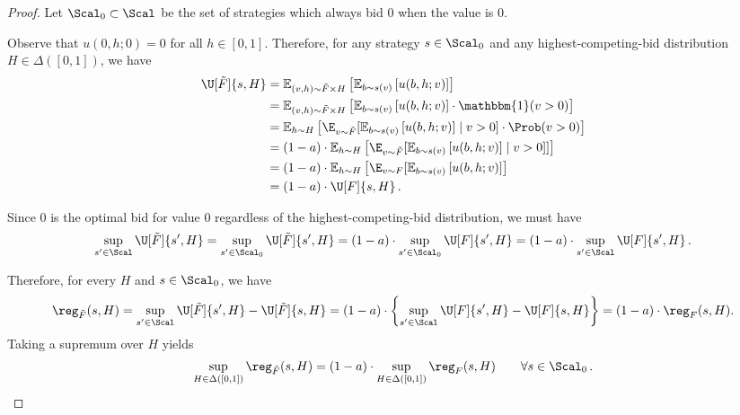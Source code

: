 \begin{proof}
	
	Let $\Scal_0 \subset \Scal$ be the set of strategies which always bid $0$ when the value is $0$.
	
	Observe that $u(0,h;0) = 0$ for all $h \in [0,1]$. Therefore, for any strategy $s \in \Scal_0$ and any highest-competing-bid distribution $H \in \Delta([0,1])$, we have
	\begin{align*}
		\U[\tilde F]{s, H} &= \mathbb{E}_{(v, h) \sim \tilde F \times H}  \left[ \mathbb{E}_{b \sim s(v)} \left[ u(b,h;v) \right] \right]\\
		&= \mathbb{E}_{(v, h) \sim \tilde F \times H}  \left[ \mathbb{E}_{b \sim s(v)} \left[ u(b,h;v) \right] \cdot \mathbbm{1}(v > 0) \right]\\
		&= \mathbb{E}_{h \sim H}\left[ \E_{v \sim \tilde F}  [ \mathbb{E}_{b \sim s(v)} \left[ u(b,h;v) \right] \mid v > 0] \cdot \Prob(v > 0) \right]\\
		&= (1 - a) \cdot \mathbb{E}_{h \sim H}\left[ \E_{v \sim \tilde F}  [ \mathbb{E}_{b \sim s(v)} \left[ u(b,h;v) \right] \mid v > 0]] \right]\\
		&= (1 - a) \cdot \mathbb{E}_{h \sim H}\left[ \E_{v \sim F} [ \mathbb{E}_{b \sim s(v)} \left[ u(b,h;v) \right] \right]\\
		&= (1 - a) \cdot \U[F]{s, H}\,.
	\end{align*}
	
	Since 0 is the optimal bid for value 0 regardless of the highest-competing-bid distribution, we must have
	\begin{align*}
		\sup_{s' \in \Scal} \U[\tilde F]{s',H} = \sup_{s' \in \Scal_0} \U[\tilde F]{s', H} = (1 - a) \cdot \sup_{s' \in \Scal_0} \U[F]{s', H} = (1 - a) \cdot \sup_{s' \in \Scal} \U[F]{s',H}\,.
	\end{align*}
	
	Therefore, for every $H$ and $s \in \Scal_0$, we have
	\begin{align*}
		\reg_{\tilde F}(s, H) = \sup_{s' \in \Scal} \U[\tilde F]{s',H} - \U[\tilde F]{s,H} = (1 -a) \cdot \left\{ \sup_{s' \in \Scal} \U[F]{s',H} - \U[F]{s,H} \right\} = (1 -a)\cdot \reg_F(s, H).
	\end{align*}
	Taking a supremum over $H$ yields
	\begin{align*}
		\sup_{H \in \Delta([0,1])} \reg_{\tilde F}(s, H) = (1 -a)\cdot \sup_{H \in \Delta([0,1])} \reg_F(s, H) \qquad \forall s \in \Scal_0\,.
	\end{align*}
	

\end{proof}
